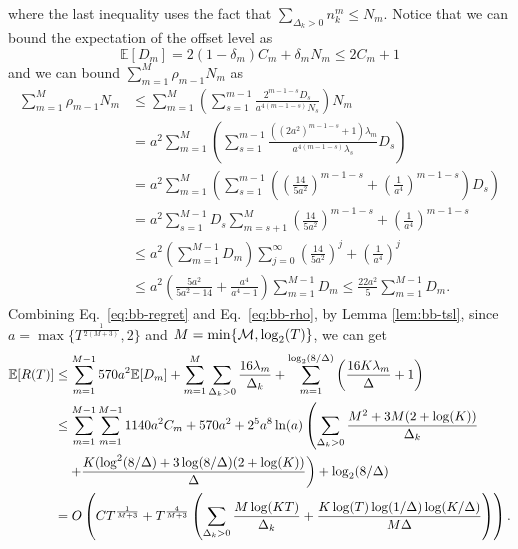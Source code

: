 where the last inequality uses the fact that $\sum_{\Delta_k>0} n_k^m\le N_m$. Notice that we can bound the expectation of the offset level as
\[\mathbb{E}[D_m] = 2(1-\delta_m)C_m + \delta_m N_m \leq 2C_m + 1\]
and we can bound $\sum_{m=1}^M \rho_{m-1} N_m$ as
\begin{equation}\label{eq:bb-rho}
    \begin{split}
        \sum_{m=1}^M \rho_{m-1} N_m
        &\leq \sum_{m=1}^M \left(\sum_{s=1}^{m-1}\frac{2^{m-1-s}D_s}{a^{4(m-1-s)}N_s}\right)N_m \\
        &= a^2\sum_{m=1}^M \left(\sum_{s=1}^{m-1}\frac{((2a^2)^{m-1-s} + 1)\lambda_m}{a^{4(m-1-s)}\lambda_s}D_s\right)\\
        &= a^2\sum_{m=1}^M \left(\sum_{s=1}^{m-1}\left(\left(\frac{14}{5a^2}\right)^{m-1-s} + \left(\frac{1}{a^4}\right)^{m-1-s}\right)D_s\right) \\
        &= a^2\sum_{s=1}^{M-1} D_s \sum_{m=s+1}^M \left(\frac{14}{5a^2}\right)^{m-1-s} + \left(\frac{1}{a^4}\right)^{m-1-s}\\
        &\leq a^2\left(\sum_{m=1}^{M-1} D_m\right)\sum_{j=0}^{\infty} \left(\frac{14}{5a^2}\right)^{j} + \left(\frac{1}{a^4}\right)^{j}\\
        &\leq a^2\left(\frac{5a^2}{5a^2-14} + \frac{a^4}{a^4 - 1}\right)\sum_{m=1}^{M-1} D_m
        \leq \frac{22a^2}{5}\sum_{m=1}^{M-1} D_m.
    \end{split}
\end{equation}
Combining Eq.~\eqref{eq:bb-regret} and Eq.~\eqref{eq:bb-rho}, by Lemma \ref{lem:bb-tsl}, since $a = \max\{T^{\frac{1}{2(M+3)}},2\}$ and $M = \min\{{\mathcal{M}}, \log_2(T)\}$, we can get
\begin{equation*}
    \begin{split}
        {\mathbb{E}}[R(T)]
        &\leq \sum_{m=1}^{M-1}570a^2 {\mathbb{E}}[D_m] + \sum_{m=1}^M \sum_{\Delta_k > 0}\frac{16\lambda_m}{\Delta_k} + \sum_{m=1}^{\log_2(8/\Delta)}\left(\frac{16K\lambda_m}{\Delta} + 1\right) \\
        &\leq \sum_{m=1}^{M-1} \sum_{m=1}^{M-1} 1140a^2 C_m + 570a^2 + 2^{5}a^{8}\ln(a)\left(\sum_{\Delta_k > 0}\frac{M^2 + 3M(2 + \log(K))}{\Delta_k}\right. \\
        &\quad \left.+ \frac{K(\log^2(8/\Delta) + 3\log(8/\Delta)(2 + \log(K))}{\Delta}\right) + \log_2(8/\Delta) \\
        &= O\left(CT^{\frac{1}{M+3}} + T^{\frac{4}{M+3}}\left(\sum_{\Delta_k > 0}\frac{M\log(KT)}{\Delta_k} + \frac{K\log(T)\log(1 / \Delta)\log(K/\Delta)}{M\Delta}\right)\right).
    \end{split}
\end{equation*}
